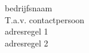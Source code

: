 \documentclass{aesbrief}
\begin{document}
\cienaam{}
\datum{\today}
\uwk{} %
\onsk{} %
\email{} %
\subject{} %

\begin{factuurbrief}{
bedrijfsnaam\\
T.a.v. contactpersoon\\
adresregel 1\\ %
adresregel 2\\ %
}

\subtotaal

\end{factuurbrief}
\end{document}
